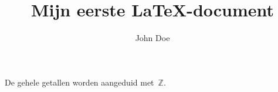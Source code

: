 \documentclass[a4paper,11pt]{article}
\author{John Doe}
\title{Mijn eerste \LaTeX-document}
\begin{document}
  \maketitle
  De gehele getallen worden aangeduid met~$\mathbb{Z}$.
\end{document}
